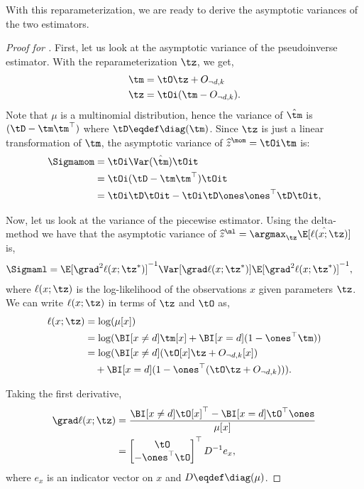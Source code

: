 With this reparameterization, we are ready to derive the asymptotic
variances of the two estimators.

\begin{proof}[Proof for ]
  First, let us look at the
  asymptotic variance of the pseudoinverse estimator. With the
  reparameterization $\tz$, we get,
  \begin{align*}
    \tm &= \tO \tz +  O_{\neg d,k} \\
    \tz &= \tOi (\tm - O_{\neg d,k}).
  \end{align*}
  Note that $\mu$ is a multinomial distribution, hence the variance of
    $\hat\tm$ is $(\tD - \tm \tm^\top)$ where $\tD \eqdef \diag(\tm)$.
  Since $\tz$ is just a linear transformation of $\tm$,
  the asymptotic variance of $\widehat{z}^\mom = \tOi \tm$ is:
  \begin{align*}
      \Sigmamom &= \tOi \Var(\hat\tm) \tOit \\
      &= \tOi (\tD - \tm \tm^\top) \tOit \\
      &= \tOi \tD \tOit - \tOi \tD \ones \ones^\top \tD \tOit,
  \end{align*}
  

  Now, let us look at the variance of the piecewise estimator.  Using
  the delta-method \cite{vaart98asymptotic} we have that the asymptotic
  variance of 
  $\widehat{z}^\ml = \argmax_{\tz} \hat\E[\ell(x ; \tz)]$ is,
  \begin{align*}
    \Sigmaml &= \E[\grad^2 \ell(x ; \tz^*)]^{-1} \Var[\grad \ell(x ; \tz^*)] \E[\grad^2 \ell(x ; \tz^*)]^{-1},
  \end{align*}
  where $\ell(x;\tz)$ is the log-likelihood of the observations $x$
  given parameters $\tz$. We can write $\ell(x;\tz)$ in terms of $\tz$
  and $\tO$ as,
  \begin{align*}
    \ell(x;\tz) 
              &= \log( \mu[x] ) \\
              &= \log( \BI[x \neq d] \tm[x] + \BI[x = d] (1 - \ones^\top \tm ) )\\
              &= \log( \BI[x \neq d] (\tO[x] \tz + O_{\neg d, k}[x]) \\
              &\quad + \BI[x = d] (1 - \ones^\top (\tO \tz + O_{\neg d, k})) ).
  \end{align*}

Taking the first derivative,
\begin{align}
  \grad \ell(x; \tz)
  &= 
  \frac{\BI[x \neq d] \tO[x]^\top - \BI[x = d] \tO^\top \ones }{\mu[x]} 
  \nonumber \\ 
  &= 
  \begin{bmatrix}
    \tO \\
    -\ones^\top \tO
  \end{bmatrix}^\top
  D^{-1} e_x, \label{eqn:lhood-grad}
\end{align}
where $e_x$ is an indicator vector on $x$ and $D \eqdef \diag(\mu)$.


\end{proof}
